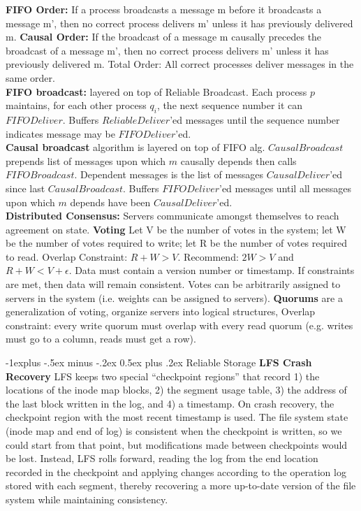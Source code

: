 \documentclass[9pt,landscape]{article}
\makeatletter
\renewcommand{\subsection}{\@startsection{subsection}{2}{0mm}%
                                {-1explus -.5ex minus -.2ex}%
                                {0.5ex plus .2ex}%
                                {\normalfont\normalsize\bfseries}}
\makeatother
\begin{document}
\begin{multicols}{3}
{\bf FIFO Order:} If a process broadcasts a message m before it broadcasts a message m', then no correct process delivers m' unless it has previously delivered m. 
{\bf Causal Order:} If the broadcast of a message m causally precedes the broadcast of a message m', then no correct process delivers m' unless it has previously delivered m. 
Total Order: All correct processes deliver messages in the same order.\\
{\bf FIFO broadcast:} layered on top of Reliable Broadcast. Each process $p$ maintains, for each other process $q_i$, the next sequence number it can $FIFODeliver$. Buffers $ReliableDeliver$'ed messages until the sequence number indicates message may be $FIFODeliver$'ed.\\
{\bf Causal broadcast} algorithm is layered on top of FIFO alg. $CausalBroadcast$ prepends list of messages upon which $m$ causally depends then calls $FIFOBroadcast$. Dependent messages is the list of messages $CausalDeliver$'ed since last $CausalBroadcast$. Buffers $FIFODeliver$'ed messages until all messages upon which $m$ depends have been $CausalDeliver$'ed.\\ 
{\bf Distributed Consensus:} Servers communicate amongst themselves to reach agreement on state.
{\bf Voting} Let V be the number of votes in the system; let W be the number of votes required to write; let R be the number of votes required to read. Overlap Constraint: $R + W > V$. Recommend: $2W > V$ and $R + W < V + \epsilon$. Data must contain a version number or timestamp. If constraints are met, then data will remain consistent. Votes can be arbitrarily assigned to servers in
the system (i.e. weights can be assigned to servers).
{\bf Quorums} are a generalization of voting, organize servers into logical structures, Overlap constraint: every write quorum must overlap with every read quorum (e.g. writes must go to a column, reads must get a row).

\subsection{Reliable Storage}
{\bf LFS Crash Recovery} LFS keeps two special “checkpoint regions” that record 1) the locations of the inode map blocks, 2) the segment usage table, 3) the address of the last block written in the log, and 4) a timestamp. On crash recovery, the checkpoint region with the most recent timestamp is used. The file system state (inode map and end of log) is consistent when the checkpoint is written, so we could start from that point, but modifications made between checkpoints would be lost. Instead, LFS rolls forward, reading the log from the end location recorded in the checkpoint and applying changes according to the operation log stored with each segment, thereby recovering a more up-to-date version of the file system while maintaining consistency.


\end{multicols}
\end{document}
